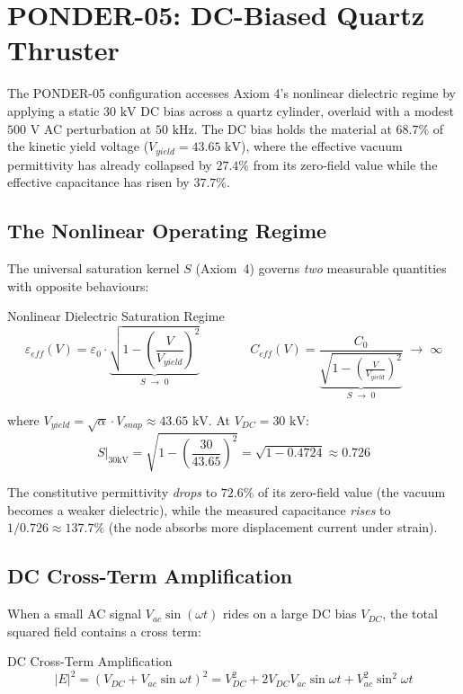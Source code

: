 \chapter{PONDER-05: DC-Biased Quartz Thruster}
\label{ch:ponder_05}

The PONDER-05 configuration accesses Axiom 4's nonlinear dielectric regime by applying a static $30\text{ kV}$ DC bias across a quartz cylinder, overlaid with a modest $500\text{ V}$ AC perturbation at $50\text{ kHz}$. The DC bias holds the material at $68.7\%$ of the kinetic yield voltage ($V_{yield} = 43.65\text{ kV}$), where the effective vacuum permittivity has already collapsed by $27.4\%$ from its zero-field value while the effective capacitance has risen by $37.7\%$.

\section{The Nonlinear Operating Regime}

The universal saturation kernel $S$ (Axiom~4) governs \emph{two} measurable quantities with opposite behaviours:
\begin{resultbox}{Nonlinear Dielectric Saturation Regime}
\begin{equation}
    \varepsilon_{eff}(V) = \varepsilon_0 \cdot \underbrace{\sqrt{1 - \left(\frac{V}{V_{yield}}\right)^{\!2}}}_{S \;\to\; 0}
    \qquad\qquad
    C_{eff}(V) = \frac{C_0}{\underbrace{\sqrt{1 - \left(\frac{V}{V_{yield}}\right)^{\!2}}}_{S \;\to\; 0}} \;\to\; \infty
\end{equation}
\end{resultbox}
where $V_{yield} = \sqrt{\alpha} \cdot V_{snap} \approx 43.65\text{ kV}$. At $V_{DC} = 30\text{ kV}$:
\begin{equation}
    S\big|_{30\text{kV}} = \sqrt{1 - \left(\frac{30}{43.65}\right)^{\!2}} = \sqrt{1 - 0.4724} \approx 0.726
\end{equation}

The constitutive permittivity \emph{drops} to $72.6\%$ of its zero-field value (the vacuum becomes a weaker dielectric), while the measured capacitance \emph{rises} to $1/0.726 \approx 137.7\%$ (the node absorbs more displacement current under strain).

\section{DC Cross-Term Amplification}

When a small AC signal $V_{ac}\sin(\omega t)$ rides on a large DC bias $V_{DC}$, the total squared field contains a cross term:
\begin{resultbox}{DC Cross-Term Amplification}
\begin{equation}
    |E|^2 = (V_{DC} + V_{ac}\sin\omega t)^2 = V_{DC}^2 + 2V_{DC}V_{ac}\sin\omega t + V_{ac}^2\sin^2\omega t
\end{equation}
\end{resultbox}

